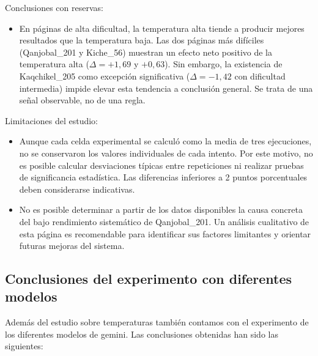 Conclusiones con reservas:

\begin{itemize}
    \item En páginas de alta dificultad, la temperatura alta tiende a producir mejores resultados que la temperatura baja. Las dos páginas más difíciles (Qanjobal\_201 y Kiche\_56) muestran un efecto neto positivo de la temperatura alta (\(\Delta=+1,69\) y \(+0,63\)). Sin embargo, la existencia de Kaqchikel\_205 como excepción significativa (\(\Delta=-1,42\) con dificultad intermedia) impide elevar esta tendencia a conclusión general. Se trata de una señal observable, no de una regla.
\end{itemize}

Limitaciones del estudio:

\begin{itemize}
    \item Aunque cada celda experimental se calculó como la media de tres ejecuciones, no se conservaron los valores individuales de cada intento. Por este motivo, no es posible calcular desviaciones típicas entre repeticiones ni realizar pruebas de significancia estadística. Las diferencias inferiores a 2 puntos porcentuales deben considerarse indicativas.
    
    \item No es posible determinar a partir de los datos disponibles la causa concreta del bajo rendimiento sistemático de Qanjobal\_201. Un análisis cualitativo de esta página es recomendable para identificar sus factores limitantes y orientar futuras mejoras del sistema.
\end{itemize}



\subsection{Conclusiones del experimento con diferentes modelos}

Además del estudio sobre temperaturas también contamos con el experimento de los diferentes modelos de gemini. Las conclusiones obtenidas han sido las siguientes:

